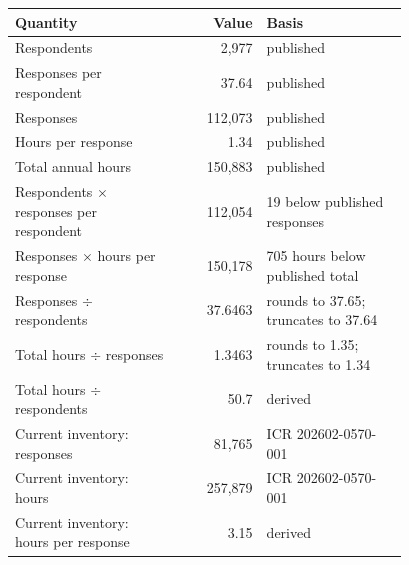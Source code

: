 \begin{tabular}{p{0.42\linewidth}rp{0.36\linewidth}}
\hline
Quantity & Value & Basis \\
\hline
Respondents & 2{,}977 & published \\
Responses per respondent & 37.64 & published \\
Responses & 112{,}073 & published \\
Hours per response & 1.34 & published \\
Total annual hours & 150{,}883 & published \\
Respondents $\times$ responses per respondent & 112{,}054 & 19 below published responses \\
Responses $\times$ hours per response & 150{,}178 & 705 hours below published total \\
Responses $\div$ respondents & 37.6463 & rounds to 37.65; truncates to 37.64 \\
Total hours $\div$ responses & 1.3463 & rounds to 1.35; truncates to 1.34 \\
Total hours $\div$ respondents & 50.7 & derived \\
Current inventory: responses & 81{,}765 & ICR 202602-0570-001 \\
Current inventory: hours & 257{,}879 & ICR 202602-0570-001 \\
Current inventory: hours per response & 3.15 & derived \\
\hline
\end{tabular}
